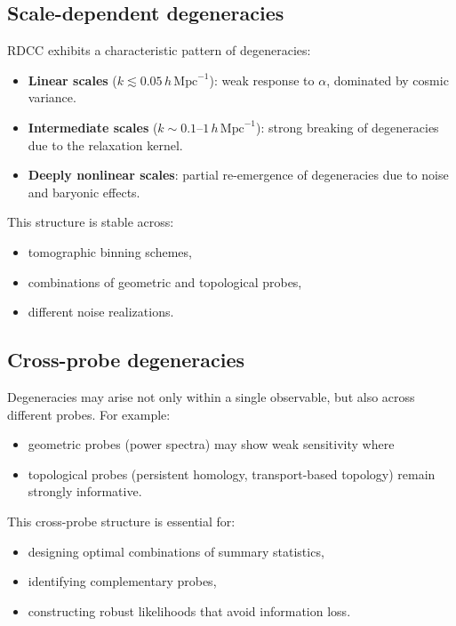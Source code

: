 \documentclass[11pt,a4paper]{article}
\begin{document}
\subsection{Scale-dependent degeneracies}

RDCC exhibits a characteristic pattern of degeneracies:
\begin{itemize}
    \item \textbf{Linear scales} ($k \lesssim 0.05\,h\,\mathrm{Mpc}^{-1}$):  
    weak response to $\alpha$, dominated by cosmic variance.

    \item \textbf{Intermediate scales} ($k \sim 0.1$--$1\,h\,\mathrm{Mpc}^{-1}$):  
    strong breaking of degeneracies due to the relaxation kernel.

    \item \textbf{Deeply nonlinear scales}:  
    partial re-emergence of degeneracies due to noise and baryonic effects.
\end{itemize}

This structure is stable across:
\begin{itemize}
    \item tomographic binning schemes,
    \item combinations of geometric and topological probes,
    \item different noise realizations.
\end{itemize}

\subsection{Cross-probe degeneracies}

Degeneracies may arise not only within a single observable, but also across 
different probes. For example:
\begin{itemize}
    \item geometric probes (power spectra) may show weak sensitivity where
    \item topological probes (persistent homology, transport-based topology)
    remain strongly informative.
\end{itemize}

This cross-probe structure is essential for:
\begin{itemize}
    \item designing optimal combinations of summary statistics,
    \item identifying complementary probes,
    \item constructing robust likelihoods that avoid information loss.
\end{itemize}
\end{document}
